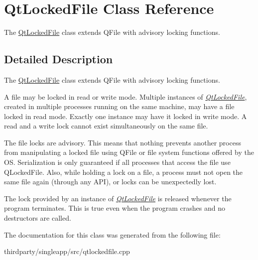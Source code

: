 \hypertarget{class_qt_locked_file}{}\section{Qt\+Locked\+File Class Reference}
\label{class_qt_locked_file}


The \hyperlink{class_qt_locked_file}{Qt\+Locked\+File} class extends Q\+File with advisory locking functions.  




\subsection{Detailed Description}
The \hyperlink{class_qt_locked_file}{Qt\+Locked\+File} class extends Q\+File with advisory locking functions. 

A file may be locked in read or write mode. Multiple instances of {\itshape \hyperlink{class_qt_locked_file}{Qt\+Locked\+File}}, created in multiple processes running on the same machine, may have a file locked in read mode. Exactly one instance may have it locked in write mode. A read and a write lock cannot exist simultaneously on the same file.

The file locks are advisory. This means that nothing prevents another process from manipulating a locked file using Q\+File or file system functions offered by the OS. Serialization is only guaranteed if all processes that access the file use Q\+Locked\+File. Also, while holding a lock on a file, a process must not open the same file again (through any A\+PI), or locks can be unexpectedly lost.

The lock provided by an instance of {\itshape \hyperlink{class_qt_locked_file}{Qt\+Locked\+File}} is released whenever the program terminates. This is true even when the program crashes and no destructors are called. 

The documentation for this class was generated from the following file\+:\begin{DoxyCompactItemize}
\item 
thirdparty/singleapp/src/qtlockedfile.\+cpp\end{DoxyCompactItemize}
